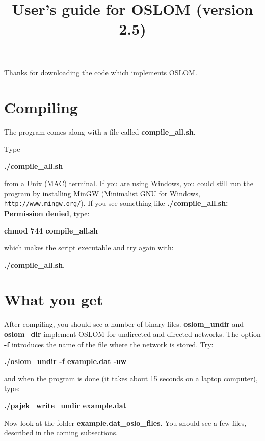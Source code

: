 \documentclass[11pt]{article}
\title{User's guide for OSLOM (version 2.5)}
\begin{document}
\maketitle

Thanks for downloading the code which implements OSLOM.


\section{Compiling}

The program comes along with a file called \textbf{compile\_all.sh}.

Type  

{ \textbf{./compile\_all.sh} }

from a Unix (MAC) terminal. If you are using Windows, you could still run
the program by installing MinGW
(Minimalist GNU for Windows, {\tt http://www.mingw.org/}).
If you see something like \textbf{./compile\_all.sh: Permission denied}, type:

\textbf{chmod 744 compile\_all.sh} 

which makes the script executable and try again with:

\textbf{./compile\_all.sh}. 

\section{What you get}

After compiling, you should see a number of binary
files. \textbf{oslom\_undir} and \textbf{oslom\_dir} 
implement OSLOM for undirected and directed networks. The option {\bf
  -f} introduces the name of the file where the network is stored. Try:

{ \textbf{./oslom\_undir -f example.dat -uw} }

and when the program is done (it takes about 15 seconds on a laptop computer), type: 

{ \textbf{./pajek\_write\_undir example.dat}}

Now look at the folder \textbf{example.dat\_oslo\_files}. You should
see a few files, described in the coming subsections.
\end{document}
